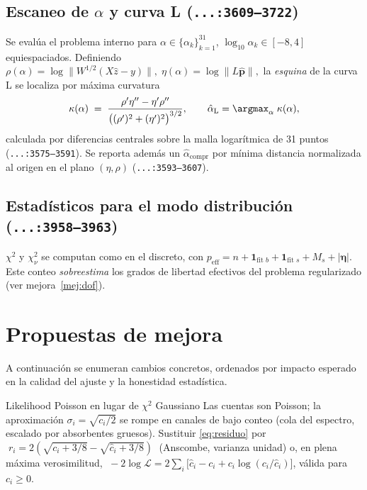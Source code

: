 \documentclass[11pt,a4paper]{article}
\newcommand{\file}[1]{\textcolor{black!70}{\texttt{\small #1}}}
\begin{document}
\subsection{Escaneo de $\alpha$ y curva L (\file{...:3609--3722})}
Se evalúa el problema interno para $\alpha\in\{\alpha_k\}_{k=1}^{31}$, $\log_{10}\alpha_k\in[-8,4]$ equiespaciados. Definiendo
\(
  \rho(\alpha) = \log\|W^{1/2}(X\hat z - y)\|,\;
  \eta(\alpha) = \log\|L\hat{\bm p}\|,
\)
la \emph{esquina} de la curva L se localiza por máxima curvatura
\begin{equation}
  \kappa(\alpha) \;=\; \frac{\rho'\eta'' - \eta'\rho''}{\bigl((\rho')^{2}+(\eta')^{2}\bigr)^{3/2}},
  \qquad \hat\alpha_{\text{L}}=\argmax_\alpha\;\kappa(\alpha),
  \label{eq:kappa}
\end{equation}
calculada por diferencias centrales sobre la malla logarítmica de 31 puntos (\file{...:3575--3591}). Se reporta además un $\hat\alpha_{\text{compr}}$ por mínima distancia normalizada al origen en el plano $(\eta,\rho)$ (\file{...:3593--3607}).

\subsection{Estadísticos para el modo distribución (\file{...:3958--3963})}
$\chi^{2}$ y $\chi^{2}_\nu$ se computan como en el discreto, con $p_{\text{eff}}=n+\mathbf 1_{\text{fit }b}+\mathbf 1_{\text{fit }s}+M_s+|\bm\eta|$. Este conteo \emph{sobreestima} los grados de libertad efectivos del problema regularizado (ver mejora~\ref{mej:dof}).

\section{Propuestas de mejora}\label{sec:mej}

A continuación se enumeran cambios concretos, ordenados por impacto esperado en la calidad del ajuste y la honestidad estadística.

\begin{mejora}{Likelihood Poisson en lugar de $\chi^{2}$ Gaussiano}\label{mej:poisson}
Las cuentas son Poisson; la aproximación $\sigma_i=\sqrt{c_i/2}$ se rompe en canales de bajo conteo (cola del espectro, escalado por absorbentes gruesos). Sustituir \eqref{eq:residuo} por
\(\;r_i = 2(\sqrt{c_i+3/8}-\sqrt{\hat c_i+3/8})\;\) (Anscombe, varianza unidad) o, en plena máxima verosimilitud,
\(\;-2\log\mathcal L = 2\sum_i\bigl[\hat c_i - c_i + c_i\log(c_i/\hat c_i)\bigr]\), válida para $c_i\ge 0$.
\end{mejora}
\end{document}
